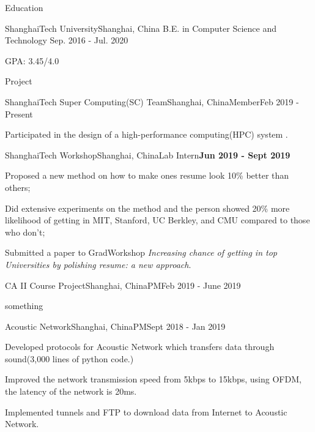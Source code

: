 \documentclass{resume} %
\begin{document}

\begin{rSection}{Education}

\begin{rSubsection}{ShanghaiTech University}{Shanghai, China} {B.E. in Computer Science and Technology} {Sep. 2016 - Jul. 2020}
    \item GPA: 3.45/4.0
\end{rSubsection}
\end{rSection}

\begin{rSection}{Project}

\begin{rSubsection}{ShanghaiTech Super Computing(SC) Team}{Shanghai, China}{Member}{Feb 2019 - Present}
	\item Participated in the design of a high-performance computing(HPC) system .
\end{rSubsection}

\begin{rSubsection}{ShanghaiTech Workshop}{Shanghai, China}{Lab Intern}{\bf{Jun 2019 - Sept 2019}}
	\item Proposed a new method on how to make ones resume look 10\% better than others;
	\item Did extensive experiments on the method and the person showed 20\% more likelihood of getting in MIT, Stanford, UC Berkley, and CMU compared to those who don't;
	\item Submitted a paper to GradWorkshop \emph{Increasing chance of getting in top Universities by polishing resume: a new approach}.
\end{rSubsection}

\begin{rSubsection}{CA II Course Project}{Shanghai, China}{PM}{Feb 2019 - June 2019}
	\item something
\end{rSubsection}

\begin{rSubsection}{Acoustic Network}{Shanghai, China}{PM}{Sept 2018 - Jan 2019}
	\item Developed protocols for Acoustic Network which transfers data through sound(3,000 lines of python code.)
	\item Improved the network transmission speed from 5kbps to 15kbps, using OFDM, the latency of the network is 20ms.
	\item Implemented tunnels and FTP to download data from Internet to Acoustic Network.
\end{rSubsection}

\end{rSection}
\end{document}
